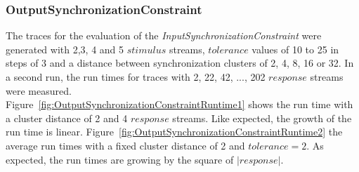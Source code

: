 \subsubsection{OutputSynchronizationConstraint}
The traces for the evaluation of the \textit{InputSynchronizationConstraint} were generated with 2,3, 4 and 5 $stimulus$ streams, $tolerance$ values of 10 to 25 in steps of 3 and a distance between synchronization clusters of 2, 4, 8, 16 or 32. In a second run, the run times for traces with 2, 22, 42, ..., 202 $response$ streams were measured.\\
Figure~\ref{fig:OutputSynchronizationConstraintRuntime1} shows the run time with a cluster distance of 2 and 4 $response$ streams. Like expected, the growth of the run time is linear. Figure~\ref{fig:OutputSynchronizationConstraintRuntime2}  the average run times with a fixed cluster distance of 2 and $tolerance=2$. As expected, the run times are growing by the square of $|response|$.
